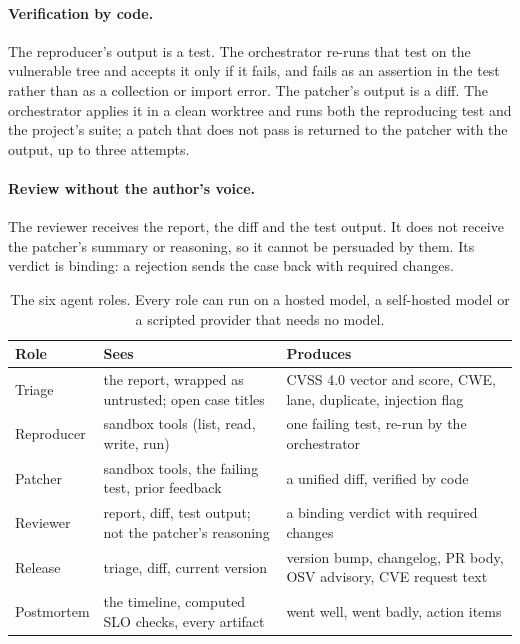 \documentclass[11pt]{article}
\begin{document}
\paragraph{Verification by code.} The reproducer's output is a test. The orchestrator re-runs that test on the
vulnerable tree and accepts it only if it fails, and fails as an assertion in the test rather than as a
collection or import error. The patcher's output is a diff. The orchestrator applies it in a clean worktree and
runs both the reproducing test and the project's suite; a patch that does not pass is returned to the patcher
with the output, up to three attempts.

\paragraph{Review without the author's voice.} The reviewer receives the report, the diff and the test output.
It does not receive the patcher's summary or reasoning, so it cannot be persuaded by them. Its verdict is
binding: a rejection sends the case back with required changes.

\begin{table}[t]
\centering\small
\begin{tabular}{@{}l>{\raggedright\arraybackslash}p{}>{\raggedright\arraybackslash}p{}@{}}
\toprule
Role & Sees & Produces \\
\midrule
Triage & the report, wrapped as untrusted; open case titles & CVSS 4.0 vector and score, CWE, lane, duplicate, injection flag \\
Reproducer & sandbox tools (list, read, write, run) & one failing test, re-run by the orchestrator \\
Patcher & sandbox tools, the failing test, prior feedback & a unified diff, verified by code \\
Reviewer & report, diff, test output; not the patcher's reasoning & a binding verdict with required changes \\
Release & triage, diff, current version & version bump, changelog, PR body, OSV advisory, CVE request text \\
Postmortem & the timeline, computed SLO checks, every artifact & went well, went badly, action items \\
\bottomrule
\end{tabular}
\caption{The six agent roles. Every role can run on a hosted model, a self-hosted model or a scripted provider
that needs no model.}
\label{tab:roles}
\end{table}
\end{document}
